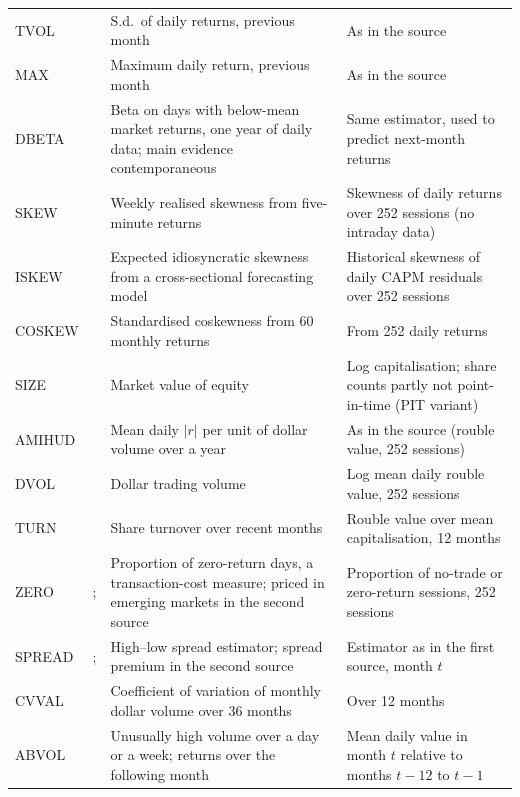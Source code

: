 \documentclass[11pt]{article}
\begin{document}
\begin{table}[H]
\begin{tabularx}{\linewidth}{@{}l>{\raggedright\arraybackslash}p{2.7cm}>{\raggedright\arraybackslash}X>{\raggedright\arraybackslash}X@{}}
TVOL & \citet{ang2006cross} & S.d.\ of daily returns, previous month & As in the source \\
MAX & \citet{bali2011maxing} & Maximum daily return, previous month & As in the source \\
DBETA & \citet{ang2006downside} & Beta on days with below-mean market returns, one year of daily data; main evidence contemporaneous & Same estimator, used to predict next-month returns \\
SKEW & \citet{amaya2015realized} & Weekly realised skewness from five-minute returns & Skewness of daily returns over 252 sessions (no intraday data) \\
ISKEW & \citet{boyer2010expected} & Expected idiosyncratic skewness from a cross-sectional forecasting model & Historical skewness of daily CAPM residuals over 252 sessions \\
COSKEW & \citet{harvey2000conditional} & Standardised coskewness from 60 monthly returns & From 252 daily returns \\
SIZE & \citet{banz1981relationship} & Market value of equity & Log capitalisation; share counts partly not point-in-time (PIT variant) \\
AMIHUD & \citet{amihud2002illiquidity} & Mean daily $|r|$ per unit of dollar volume over a year & As in the source (rouble value, 252 sessions) \\
DVOL & \citet{brennan1998alternative} & Dollar trading volume & Log mean daily rouble value, 252 sessions \\
TURN & \citet{datar1998liquidity} & Share turnover over recent months & Rouble value over mean capitalisation, 12 months \\
ZERO & \citet{lesmond1999new}; \citet{bekaert2007liquidity} & Proportion of zero-return days, a transaction-cost measure; priced in emerging markets in the second source & Proportion of no-trade or zero-return sessions, 252 sessions \\
SPREAD & \citet{corwin2012simple}; \citet{amihud1986asset} & High--low spread estimator; spread premium in the second source & Estimator as in the first source, month $t$ \\
CVVAL & \citet{chordia2001trading} & Coefficient of variation of monthly dollar volume over 36 months & Over 12 months \\
ABVOL & \citet{gervais2001high} & Unusually high volume over a day or a week; returns over the following month & Mean daily value in month $t$ relative to months $t-12$ to $t-1$ \\

\end{tabularx}
\end{table}
\end{document}
